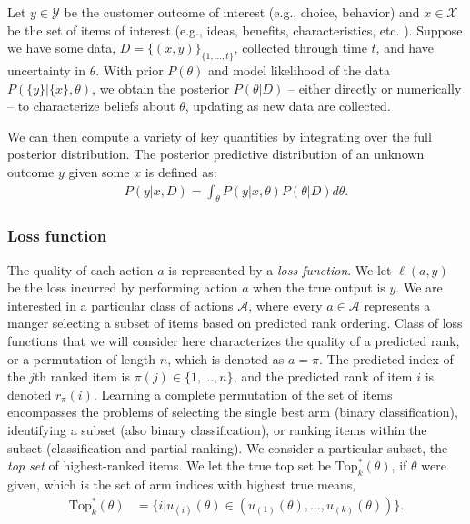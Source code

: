 \documentclass[nonblindrev]{informs3}
\newcommand{\numitems}{n}
\newcommand{\topset}{\text{Top}_k}
\begin{document}
Let $y \in \mathcal{Y}$ be the customer outcome of interest (e.g., choice, behavior) and $x \in \mathcal{X}$ be the set of items of interest (e.g., ideas, benefits, characteristics, etc. ). Suppose we have some data, $D = \{(x,y)\}_{\{1,...,t\}}$, collected through time $t$, and have uncertainty in $\theta$. With prior $P(\theta)$ and model likelihood of the data $P(\{y\}|\{x\},\theta)$, we obtain the posterior $P(\theta|D)$ -- either directly or numerically -- to characterize beliefs about $\theta$, updating as new data are collected.

We can then compute a variety of key quantities by integrating over the full posterior distribution. The posterior predictive distribution of an unknown outcome $y$ given some $x$ is defined as:
\begin{align} 
P(y|x,D) = \int_\theta P(y|x,\theta)P(\theta|D)d\theta .
\end{align}

\subsubsection{Loss function}

The quality of each action $a$ is represented by a \emph{loss function}. We let $\ell(a,y)$ be the loss incurred by performing action $a$ when the true output is $y$. We are interested in a particular class of actions $\mathcal{A}$, where every $a \in \mathcal{A}$ represents a manger selecting a subset of items based on predicted rank ordering. Class of loss functions that we will consider here characterizes the quality of a predicted rank, or a permutation of length $\numitems$, which is denoted as $a=\pi$. The predicted index of the $j$th ranked item is $\pi(j) \in \{1,\ldots,\numitems\}$, and the predicted rank of item $i$ is denoted $r_\pi(i)$. Learning a complete permutation of the set of items encompasses the problems of selecting the single best arm (binary classification), identifying a subset (also binary classification), or ranking items within the subset (classification and partial ranking). We consider a particular subset, the \emph{top set} of highest-ranked items. We let the true top set be $\topset^{*}(\theta)$, if $\theta$ were given, which is the set of arm indices with highest true means, 
\begin{align}
\topset^{*}(\theta) &= \{i | u_{(i)}(\theta) \in ( u_{(1)}(\theta),\ldots,u_{(k)}(\theta) ) \}.
\end{align}
\end{document}
